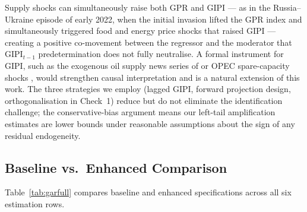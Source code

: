 \documentclass[12pt]{article}
\begin{document}
Supply shocks can simultaneously raise both GPR and GIPI --- as in
the Russia--Ukraine episode of early 2022, when the initial invasion
lifted the GPR index and simultaneously triggered food and energy price
shocks that raised GIPI --- creating a positive co-movement between the
regressor and the moderator that GIPI$_{t-1}$ predetermination does not
fully neutralise.
A formal instrument for GIPI, such as the exogenous oil supply news
series of \citet{baumeister2019} or OPEC spare-capacity shocks
\citep{caldara2022}, would strengthen causal interpretation and is a
natural extension of this work.
The three strategies we employ (lagged GIPI, forward projection design,
orthogonalisation in Check~1) reduce but do not eliminate the
identification challenge; the conservative-bias argument means our
left-tail amplification estimates are lower bounds under reasonable
assumptions about the sign of any residual endogeneity.

\subsection{Baseline vs.\ Enhanced Comparison}

Table~\ref{tab:garfull} compares baseline and enhanced specifications
across all six estimation rows.
\end{document}
